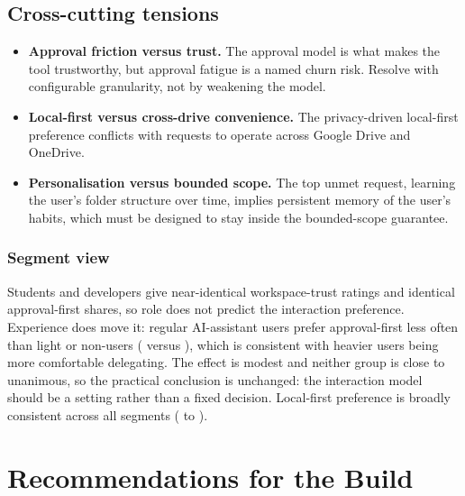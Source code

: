 \documentclass[11pt]{article}
\begin{document}
\subsection{Cross-cutting tensions}
\begin{itemize}
  \item \textbf{Approval friction versus trust.} The approval model is what makes the tool
        trustworthy, but approval fatigue is a named churn risk. Resolve with configurable
        granularity, not by weakening the model.
  \item \textbf{Local-first versus cross-drive convenience.} The privacy-driven local-first
        preference conflicts with requests to operate across Google Drive and OneDrive.
  \item \textbf{Personalisation versus bounded scope.} The top unmet request, learning the
        user's folder structure over time, implies persistent memory of the user's habits,
        which must be designed to stay inside the bounded-scope guarantee.
\end{itemize}

\subsubsection{Segment view}



Students and developers give near-identical workspace-trust ratings and identical approval-first
shares, so role does not predict the interaction preference. Experience does move it: regular
AI-assistant users prefer approval-first less often than light or non-users
(\PctPrefAHeavy{}\pctsym{} versus \PctPrefALight{}\pctsym{}), which is consistent with heavier
users being more comfortable delegating. The effect is modest and neither group is close to
unanimous, so the practical conclusion is unchanged: the interaction model should be a setting
rather than a fixed decision. Local-first preference is broadly consistent across all segments
(\PctLocalDev{}\pctsym{} to \PctLocalStudent{}\pctsym{}).

\section{Recommendations for the Build}
\end{document}
